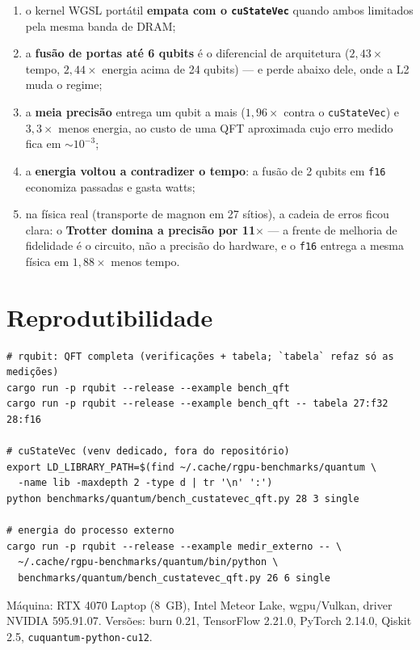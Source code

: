 \documentclass[11pt,a4paper]{article}
\begin{document}
\begin{enumerate}
\item o kernel WGSL portátil \textbf{empata com o \texttt{cuStateVec}} quando
  ambos limitados pela mesma banda de DRAM;
\item a \textbf{fusão de portas até 6 qubits} é o diferencial de arquitetura
  ($2{,}43\times$ tempo, $2{,}44\times$ energia acima de 24 qubits) --- e
  perde abaixo dele, onde a L2 muda o regime;
\item a \textbf{meia precisão} entrega um qubit a mais ($1{,}96\times$ contra
  o \texttt{cuStateVec}) e $3{,}3\times$ menos energia, ao custo de uma QFT
  aproximada cujo erro medido fica em $\sim10^{-3}$;
\item a \textbf{energia voltou a contradizer o tempo}: a fusão de 2 qubits em
  \texttt{f16} economiza passadas e gasta watts;
\item na física real (transporte de magnon em 27 sítios), a cadeia de erros
  ficou clara: o \textbf{Trotter domina a precisão por 11$\times$} --- a
  frente de melhoria de fidelidade é o circuito, não a precisão do hardware,
  e o \texttt{f16} entrega a mesma física em $1{,}88\times$ menos tempo.
\end{enumerate}

\appendix
\section{Reprodutibilidade}

\begin{verbatim}
# rqubit: QFT completa (verificações + tabela; `tabela` refaz só as medições)
cargo run -p rqubit --release --example bench_qft
cargo run -p rqubit --release --example bench_qft -- tabela 27:f32 28:f16

# cuStateVec (venv dedicado, fora do repositório)
export LD_LIBRARY_PATH=$(find ~/.cache/rgpu-benchmarks/quantum \
  -name lib -maxdepth 2 -type d | tr '\n' ':')
python benchmarks/quantum/bench_custatevec_qft.py 28 3 single

# energia do processo externo
cargo run -p rqubit --release --example medir_externo -- \
  ~/.cache/rgpu-benchmarks/quantum/bin/python \
  benchmarks/quantum/bench_custatevec_qft.py 26 6 single
\end{verbatim}

Máquina: RTX 4070 Laptop (8~GB), Intel Meteor Lake, wgpu/Vulkan, driver NVIDIA
595.91.07. Versões: burn 0.21, TensorFlow 2.21.0, PyTorch 2.14.0, Qiskit 2.5,
\texttt{cuquantum-python-cu12}.
\end{document}
